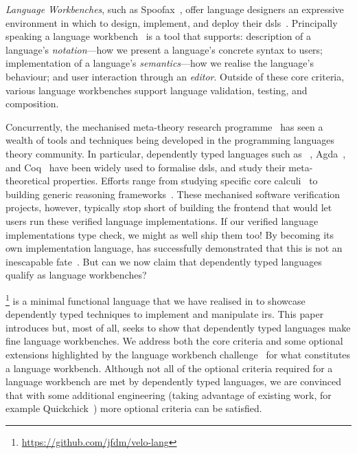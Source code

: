 \emph{Language Workbenches}, such as
Spoofax~\cite{DBLP:journals/software/WachsmuthKV14},
offer language designers an expressive environment in which to design,
implement, and deploy their \Acp{dsl}~\cite{hudak1996building}.
%
Principally speaking a language workbench~\cite{DBLP:conf/sle/ErdwegSVBBCGHKLKMPPSSSVVVWW13}
is a tool that supports:
description of a language's \emph{notation}---how we present a language's concrete syntax to users;
implementation of a language's \emph{semantics}---how we realise the language's behaviour;
and user interaction through an \emph{editor}.
%
Outside of these core criteria, various language workbenches
support language validation, testing, and composition.


Concurrently, the mechanised meta-theory research
programme~\cite{DBLP:conf/tphol/AydemirBFFPSVWWZ05,DBLP:journals/jfp/AbelAHPMSS19}
has seen a wealth of tools and techniques being developed
in the programming languages theory community.
%
In particular, dependently typed languages such as
\Idris{}~\cite{DBLP:conf/ecoop/Brady21},
Agda~\cite{DBLP:conf/afp/Norell08},
and Coq~\cite{the_coq_development_team_2022_5846982}
have been widely used to formalise \acp{dsl}, and study their
meta-theoretical properties.
%
Efforts range from
studying specific core calculi~\cite{10.1145/3093333.3009866,DBLP:conf/cpp/RouvoetPKV20,DBLP:conf/mpc/ChapmanKNW19}
to building generic reasoning frameworks~\cite{DBLP:conf/cpp/StarkSK19,DBLP:journals/jfp/AllaisACMM21}.
%
These mechanised software verification projects, however, typically stop short
of building the frontend that would let users run these verified
language implementations.
If our verified language implementations type check, we might as well ship them too!
%
By becoming its own implementation language, \Idris{} has successfully
demonstrated that this is not an inescapable fate~\cite{DBLP:conf/ecoop/Brady21}.
%
But can we now claim that dependently typed languages qualify as
language workbenches?

\Velo{}\footnote{\url{https://github.com/jfdm/velo-lang}} is a minimal functional language that we have realised in \Idris{}
to showcase dependently typed techniques to implement and manipulate \acp{ir}.
%
This paper introduces \Velo{} but, most of all, seeks to show that
dependently typed languages make fine language workbenches.
%
We address both the core criteria and some optional extensions
highlighted by the language workbench challenge~\cite{DBLP:conf/sle/ErdwegSVBBCGHKLKMPPSSSVVVWW13} for what constitutes a language workbench.
%
%
Although not all of the optional criteria required for a language workbench are met by dependently typed languages, we are convinced that with some additional engineering (taking advantage of existing work, for example Quickchick~\cite{DBLP:journals/pacmpl/LampropoulosPP18}) more optional criteria can be satisfied.


